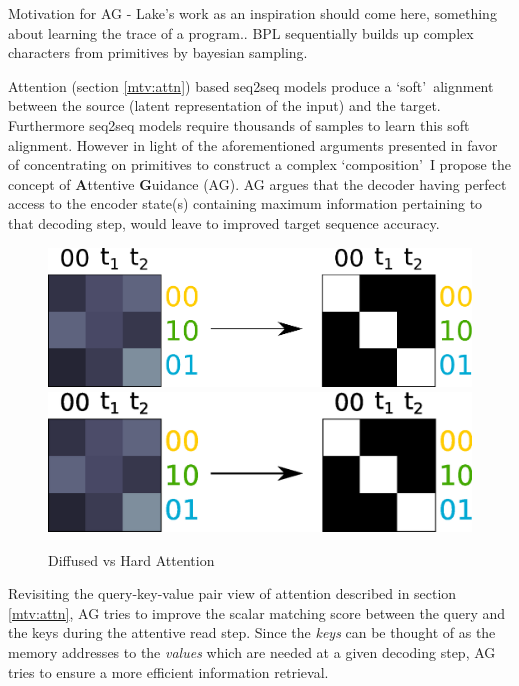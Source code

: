 Motivation for AG - Lake's work as an inspiration should come here, something about learning the trace of a program.\cite{Lake2015}. BPL sequentially builds up complex characters from primitives by bayesian sampling. 

Attention (section \ref{mtv:attn}) based seq2seq models produce a \lq soft{}\rq\ alignment between the source (latent representation of the input) and the target. Furthermore seq2seq models require thousands of samples to learn this soft alignment. However in light of the aforementioned arguments presented in favor of concentrating on primitives to construct a complex \lq composition{}\rq\ I propose the concept of \textbf{A}ttentive \textbf{G}uidance (AG). AG argues that the decoder having perfect access to the encoder state(s) containing maximum information pertaining to that decoding step, would leave to improved target sequence accuracy.

\begin{figure}
	\begin{minipage}[t]{\textwidth}
		\ifpdf
		\includegraphics[width=\linewidth,keepaspectratio=true]{./figs/attention-guidance-pdf}
		\else
		\includegraphics[width=\linewidth,keepaspectratio=true]{./figs/attention-guidance-eps}
		\fi
		\caption{\small Diffused vs Hard Attention}
		\label{pm:ag-schematic}
	\end{minipage}
\end{figure}

Revisiting the query-key-value pair view of attention described in section \ref{mtv:attn}, AG tries to improve the scalar matching score between the query and the keys during the attentive read step. Since the \textit{keys} can be thought of as the memory addresses to the \textit{values} which are needed at a given decoding step, AG tries to ensure a more efficient information retrieval. 

